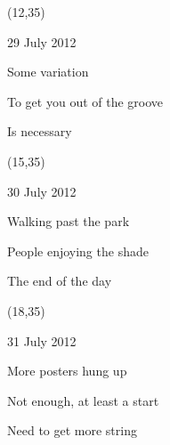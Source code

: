 \documentclass[10pt]{article}
\begin{document}

\begin{textblock}{3}(12,35)
\begin{sideways}
29 July 2012 
\end{sideways}
\begin{sideways}
Some variation
\end{sideways}
\begin{sideways}
To get you out of the groove
\end{sideways}
\begin{sideways}
Is necessary
\end{sideways}
\end{textblock}

\begin{textblock}{3}(15,35)
\begin{sideways}
30 July 2012 
\end{sideways}
\begin{sideways}
Walking past the park
\end{sideways}
\begin{sideways}
People enjoying the shade\hspace*{3mm}
\end{sideways}
\begin{sideways}
The end of the day
\end{sideways}
\end{textblock}

\begin{textblock}{3}(18,35)
\begin{sideways}
31 July 2012 
\end{sideways}
\begin{sideways}
More posters hung up
\end{sideways}
\begin{sideways}
Not enough, at least a start
\end{sideways}
\begin{sideways}
Need to get more string
\end{sideways}
\end{textblock}
\end{document}
